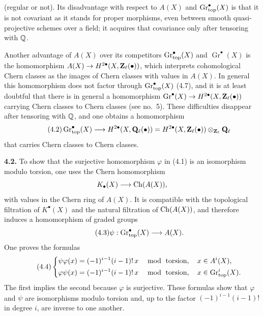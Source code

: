 (regular or not). Its disadvantage with respect to $A(X)$ and
$\operatorname{Gr}_{\mathrm{top}}^\bullet(X)$ is that it is not covariant as it stands for proper
morphisms, even between smooth quasi-projective schemes over a field; it
acquires that covariance only after tensoring with $\mathbb Q$.

Another advantage of $A(X)$ over its competitors $\operatorname{Gr}_{\mathrm{top}}^\bullet(X)$ and
$\operatorname{Gr}^\bullet(X)$ is the homomorphism
$A(X)\to H^{2\bullet}(X,\mathbf Z_\ell(\bullet))$, which interprets cohomological
Chern classes as the images of Chern classes with values in $A(X)$. In
general this homomorphism does not factor through $\operatorname{Gr}_{\mathrm{top}}^\bullet(X)$ (4.7),
and it is at least doubtful that there is in general a homomorphism
$\operatorname{Gr}^\bullet(X)\to H^{2\bullet}(X,\mathbf Z_\ell(\bullet))$ carrying
Chern classes to Chern classes (see no.~5). These difficulties disappear
after tensoring with $\mathbb Q$, and one obtains a homomorphism
\begin{equation}\tag{4.2}
 \operatorname{Gr}_{\mathrm{top}}^\bullet(X)\longrightarrow H^{2\bullet}(X,\mathbf Q_\ell(\bullet))
  =H^{2\bullet}(X,\mathbf Z_\ell(\bullet))\otimes_{\mathbf Z_\ell}\mathbf Q_\ell
\end{equation}
that carries Chern classes to Chern classes.

\textbf{4.2.} To show that the surjective homomorphism $\varphi$ in (4.1)
is an isomorphism modulo torsion, one uses the Chern homomorphism
\[
 K_\bullet(X)\longrightarrow \operatorname{Ch}(A(X)),
\]
with values in the Chern ring of $A(X)$. It is compatible with the
topological filtration of $K^\bullet(X)$ and the natural filtration of
$\operatorname{Ch}(A(X))$, and therefore induces a homomorphism of graded groups
\begin{equation}\tag{4.3}
 \psi:\operatorname{Gr}_{\mathrm{top}}^\bullet(X)\longrightarrow A(X).
\end{equation}
One proves the formulas
\begin{equation}\tag{4.4}
\left\{
\begin{aligned}
 \psi\varphi(x)&=(-1)^{i-1}(i-1)!\,x
   &&\bmod\text{ torsion},\quad x\in A^i(X),\\
 \varphi\psi(x)&=(-1)^{i-1}(i-1)!\,x
   &&\bmod\text{ torsion},\quad x\in \operatorname{Gr}_{\mathrm{top}}^i(X).
\end{aligned}
\right.
\end{equation}
The first implies the second because $\varphi$ is surjective. These formulas
show that $\varphi$ and $\psi$ are isomorphisms modulo torsion and, up to
the factor $(-1)^{i-1}(i-1)!$ in degree $i$, are inverse to one another.

